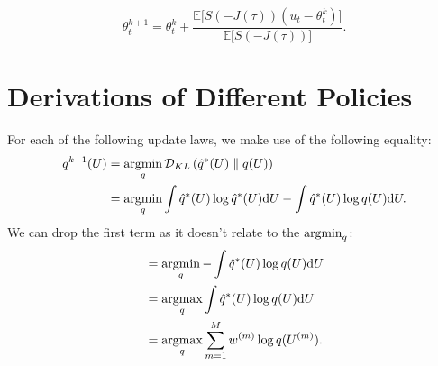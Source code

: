 \documentclass[twoside,11pt]{article}
\begin{document}
\begin{equation}
\theta_t^{k+1}
= \theta_t^k + \frac{\mathbb{E}\Big[S(-J(\tau)) (u_t - \theta_t^k) \Big]}{\mathbb{E} \Big[S(-J(\tau))\Big]}.
\end{equation}

\section{Derivations of Different Policies}
\label{appendix: policy}

For each of the following update laws, we make use of the following equality:
\begin{align} \label{eq:derive:kl_mle}
    q^{k+1}(U)
    &= \argmin_{q} \KL{\hat{q}^*(U)}{q(U)} \\
    &= \argmin_{q} \int \hat{q}^*(U) \log \hat{q}^*(U) \rd U - \int \hat{q}^*(U) \log q(U) \rd U .
\end{align}
We can drop the first term as it doesn't relate to the $\argmin_{q}$:
\begin{align}
    &= \argmin_{q}  - \int \hat{q}^*(U) \log q(U) \rd U \\ 
    &= \argmax_{q} \int \hat{q}^*(U) \log q(U) \rd U \\ 
    &= \argmax_{q} \sum_{m=1}^M w^{(m)} \log q(U^{(m)}) .
\end{align}
\end{document}

